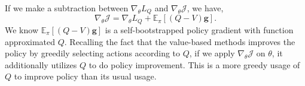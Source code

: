 If we make a subtraction between $\nabla_\theta L_Q$ and $\nabla_\theta \mathcal{J}$, we have,
\begin{equation}
\label{eq:grad_relation}
    \nabla_\theta \mathcal{J} = \nabla_\theta L_Q + \mathbb{E}_\pi \left[(Q - V) \textbf{g} \right].
\end{equation}
We know $\mathbb{E}_\pi \left[ (Q - V) \textbf{g} \right]$ is a self-bootstrapped policy gradient with function approximated $Q$.
Recalling the fact that the value-based methods improves the policy by greedily selecting actions according to $Q$, if we apply $\nabla_\theta \mathcal{J}$ on $\theta$, it additionally utilizes $Q$ to do policy improvement. 
This is a more greedy usage of $Q$ to improve policy than its usual usage. 


